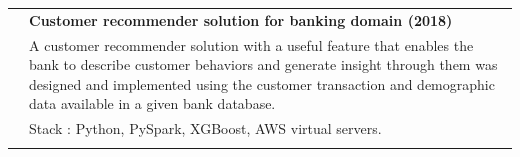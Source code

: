 \begin{supertabular}{r|p{17.5cm}}

 \textsc{} & \normalsize \bf Customer recommender solution for banking domain (2018) \\&\small {A customer recommender solution with a useful feature that enables the bank to describe customer behaviors and generate insight through them was designed and implemented using the customer transaction and demographic data available in a given bank database. }\\&\footnotesize{Stack : Python, PySpark, XGBoost, AWS virtual servers.}\\ \\
 
  
\end{supertabular}